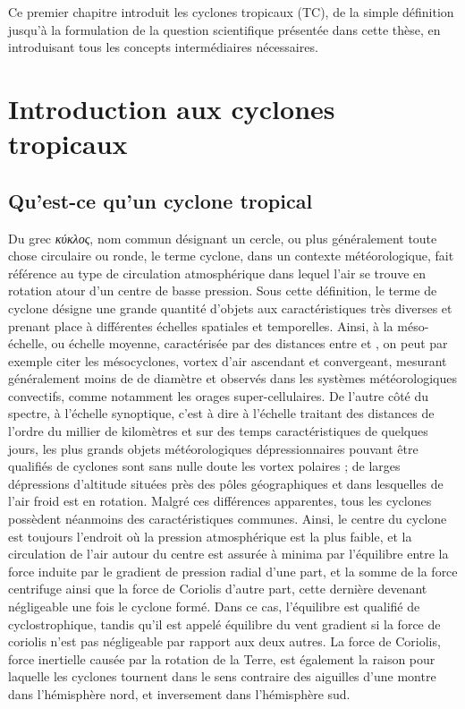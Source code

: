 \documentclass[../main.tex]{subfiles}
\begin{document}
\begin{itshape}
Ce premier chapitre introduit les cyclones tropicaux (TC), de la simple définition jusqu'à la formulation de la question scientifique présentée dans cette thèse, en introduisant tous les concepts intermédiaires nécessaires.
\end{itshape}

\minitoc\newpage
\section{Introduction aux cyclones tropicaux}

\subsection{Qu'est-ce qu'un cyclone tropical}\label{sec:quest_ce_qu_un_cyclone}

Du grec \textit{\textgreek{κύκλος}}, nom commun désignant un cercle, ou plus généralement toute chose circulaire ou ronde, le terme cyclone, dans un contexte
météorologique, fait référence au type de circulation atmosphérique dans lequel l'air se trouve en rotation atour d'un centre de basse pression. Sous cette
définition, le terme de cyclone désigne une grande quantité d'objets aux caractéristiques très diverses et prenant place à différentes échelles spatiales et
temporelles. Ainsi, à la méso-échelle, ou échelle moyenne, caractérisée par des distances entre  et , on peut par exemple citer les mésocyclones,
vortex d'air ascendant et convergeant, mesurant généralement moins de  de diamètre et observés dans les systèmes météorologiques convectifs, comme
notamment les orages super-cellulaires. De l'autre côté du spectre, à l'échelle synoptique, c'est à dire à l'échelle traitant des distances de l'ordre du
millier de kilomètres et sur des temps caractéristiques de quelques jours, les plus grands objets météorologiques dépressionnaires pouvant être qualifiés de
cyclones sont sans nulle doute les vortex polaires ; de larges dépressions d'altitude situées près des pôles géographiques et dans lesquelles de l'air froid est
en rotation. Malgré ces différences apparentes, tous les cyclones possèdent néanmoins des caractéristiques communes. Ainsi, le centre du cyclone est toujours
l'endroit où la pression atmosphérique est la plus faible, et la circulation de l'air autour du centre est assurée à minima par l'équilibre entre la force
induite par le gradient de pression radial d'une part, et la somme de la force centrifuge ainsi que la force de Coriolis d'autre part, cette dernière devenant négligeable
une fois le cyclone formé. Dans ce cas, l'équilibre est qualifié de cyclostrophique, tandis qu'il est appelé équilibre du vent gradient si la force de coriolis
n'est pas négligeable par rapport aux deux autres. La force de Coriolis, force inertielle causée par la rotation de la Terre, est également la raison pour laquelle
les cyclones tournent dans le sens contraire des aiguilles d'une montre dans l'hémisphère nord, et inversement dans l'hémisphère sud.
\end{document}
